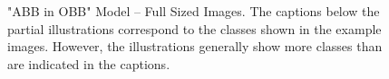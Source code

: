 \begin{figure}[h!]
    \caption["ABB in OBB" Model – Full Sized Images]{"ABB in OBB" Model – Full Sized Images. The captions below the partial illustrations correspond to the classes shown in the example images. However, the illustrations generally show more classes than are indicated in the captions.}
    \label{fig:ABBinOBB_examples_fs}
\end{figure}